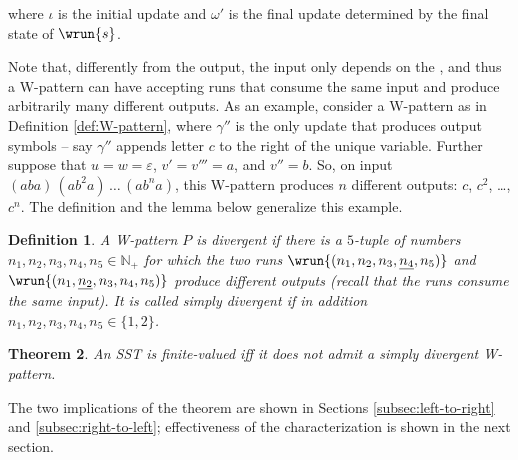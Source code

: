 \documentclass{article}
\newtheorem{theorem}{Theorem}\newtheorem{lemma}[theorem]{Lemma}\newtheorem{proposition}[theorem]{Proposition}\newtheorem{corollary}[theorem]{Corollary}\newtheorem{definition}[theorem]{Definition}\newtheorem{claim}[theorem]{Claim}\newtheorem{remark}[theorem]{Remark}\newtheorem{example}[theorem]{Example}\newtheorem*{claim*}{Claim}
\providecommand{\AP}{}\NewDocumentCommand{\reintro}{o m}{#2}
\begin{document}
where $\iota$ is the initial update
and $\omega'$ is the final update
determined by the final state of $\wrun{s}$.
\AP
Note that, differently from the output, the input 
only depends on the ,
and thus a W-pattern can have accepting runs that 
consume the same input and produce arbitrarily many 
different outputs.
As an example, consider a W-pattern as in Definition \ref{def:W-pattern}, 
where $\gamma''$ is the only update that produces output symbols
-- say $\gamma''$ appends letter $c$ to the right of the unique variable. 
Further suppose that $u=w=\varepsilon$, $v'=v'''=a$, and $v''=b$. 
So, on input $(aba) \, (a b^2 a) \, \dots \, (a b^n a)$,
this W-pattern produces $n$ different outputs:
$c$, $c^2$, \dots, $c^n$. 
The definition and the lemma below generalize this example.

\begin{definition}\label{def:skewed-W-pattern}
A W-pattern $P$ is divergent 
if there is a $5$-tuple of numbers $n_1,n_2,n_3,n_4,n_5\in\mathbb{N}_+$
for which the two runs $\wrun{(n_1,n_2,n_3,\underline{n_4},n_5)}$
and $\wrun{(n_1,\underline{n_2},n_3,n_4,n_5)}$ produce different outputs
(recall that the runs consume the same input).
It is called simply divergent if in addition
$n_1,n_2,n_3,n_4,n_5\in\{1,2\}$.
\end{definition}

\begin{theorem}\label{thm:finite-valued}
An SST is finite-valued iff it does not admit a
simply divergent W-pattern.
\end{theorem}

The two implications of the theorem are
shown in Sections \ref{subsec:left-to-right}
and \ref{subsec:right-to-left}; effectiveness
of the characterization is shown in the next
section.



\end{document}
